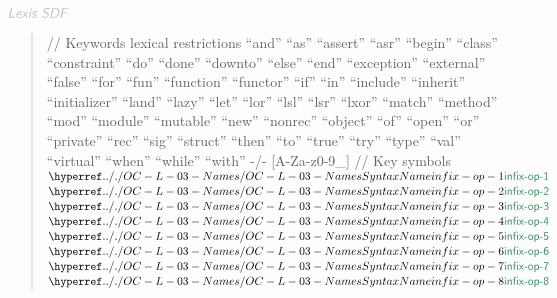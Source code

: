 $\KEY{Lexis SDF}$

\begin{quote}
// Keywords\newline
   \newline
   lexical restrictions\newline
   \newline
         {}``and{}''          {}``as{}''         {}``assert{}''   {}``asr{}''       {}``begin{}''     {}``class{}''\newline
         {}``constraint{}''   {}``do{}''         {}``done{}''     {}``downto{}''    {}``else{}''      {}``end{}''\newline
         {}``exception{}''    {}``external{}''   {}``false{}''    {}``for{}''       {}``fun{}''       {}``function{}''\newline
         {}``functor{}''      {}``if{}''         {}``in{}''       {}``include{}''   {}``inherit{}''   {}``initializer{}''\newline
         {}``land{}''         {}``lazy{}''       {}``let{}''      {}``lor{}''       {}``lsl{}''       {}``lsr{}''\newline
         {}``lxor{}''         {}``match{}''      {}``method{}''   {}``mod{}''       {}``module{}''    {}``mutable{}'' \newline
         {}``new{}''          {}``nonrec{}''     {}``object{}''   {}``of{}''        {}``open{}''      {}``or{}''     \newline
         {}``private{}''      {}``rec{}''        {}``sig{}''      {}``struct{}''    {}``then{}''      {}``to{}''\newline
         {}``true{}''         {}``try{}''        {}``type{}''     {}``val{}''       {}``virtual{}''   {}``when{}'' \newline
         {}``while{}''        {}``with{}''\newline
     -/- {[}A-Za-z0-9\_{]} \newline
   \newline
   // Key symbols\newline
   \newline
   $\SHADE{\SYNHYPER{../.}{OC-L-03-Names}{infix-op-1}}$ $\SHADE{\SYNHYPER{../.}{OC-L-03-Names}{infix-op-2}}$ $\SHADE{\SYNHYPER{../.}{OC-L-03-Names}{infix-op-3}}$ $\SHADE{\SYNHYPER{../.}{OC-L-03-Names}{infix-op-4}}$ \newline
   $\SHADE{\SYNHYPER{../.}{OC-L-03-Names}{infix-op-5}}$ $\SHADE{\SYNHYPER{../.}{OC-L-03-Names}{infix-op-6}}$ $\SHADE{\SYNHYPER{../.}{OC-L-03-Names}{infix-op-7}}$ $\SHADE{\SYNHYPER{../.}{OC-L-03-Names}{infix-op-8}}$ \newline

\end{quote}
